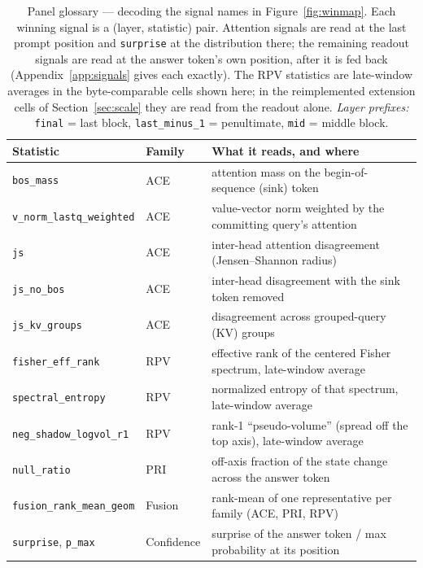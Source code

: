 \documentclass[11pt]{article}
\begin{document}
\begin{table}[tbp]
\centering
\caption{Panel glossary --- decoding the signal names in Figure~\ref{fig:winmap}. Each winning
signal is a (layer, statistic) pair. Attention signals are read at the last prompt position and
\texttt{surprise} at the distribution there; the remaining readout signals are read at the answer
token's own position, after it is fed back (Appendix~\ref{app:signals} gives each exactly). The RPV
statistics are late-window averages in the byte-comparable cells shown here; in the reimplemented
extension cells of Section~\ref{sec:scale} they are read from the readout alone.
\emph{Layer prefixes:} \texttt{final} = last block, \texttt{last\_minus\_1} = penultimate,
\texttt{mid} = middle block.}
\label{tab:glossary}
\footnotesize
\begin{tabular}{lll}
\toprule
Statistic & Family & What it reads, and where \\
\midrule
\texttt{bos\_mass}                 & ACE        & attention mass on the begin-of-sequence (sink) token \\
\texttt{v\_norm\_lastq\_weighted}  & ACE        & value-vector norm weighted by the committing query's attention \\
\texttt{js}                        & ACE        & inter-head attention disagreement (Jensen--Shannon radius) \\
\texttt{js\_no\_bos}               & ACE        & inter-head disagreement with the sink token removed \\
\texttt{js\_kv\_groups}            & ACE        & disagreement across grouped-query (KV) groups \\
\texttt{fisher\_eff\_rank}         & RPV        & effective rank of the centered Fisher spectrum, late-window average \\
\texttt{spectral\_entropy}         & RPV        & normalized entropy of that spectrum, late-window average \\
\texttt{neg\_shadow\_logvol\_r1}   & RPV        & rank-1 ``pseudo-volume'' (spread off the top axis), late-window average \\
\texttt{null\_ratio}               & PRI        & off-axis fraction of the state change across the answer token \\
\texttt{fusion\_rank\_mean\_geom}  & Fusion     & rank-mean of one representative per family (ACE, PRI, RPV) \\
\texttt{surprise}, \texttt{p\_max} & Confidence & surprise of the answer token / max probability at its position \\
\bottomrule
\end{tabular}
\end{table}
\end{document}
